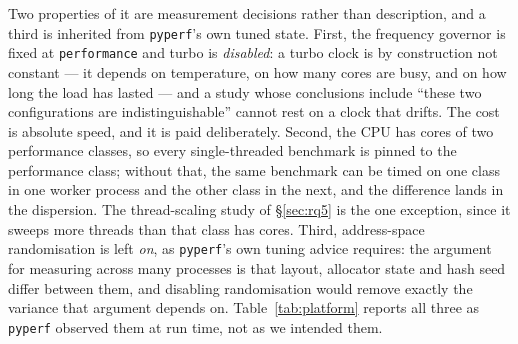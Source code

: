 \documentclass[10pt,a4paper]{article}
\newcommand{\code}[1]{\texttt{\small #1}}
\begin{document}
Two properties of it are measurement decisions rather than description, and a third is
inherited from \code{pyperf}'s own tuned state. First, the frequency
governor is fixed at \code{performance} and turbo is \emph{disabled}: a turbo clock is by
construction not constant --- it depends on temperature, on how many cores are busy, and on how
long the load has lasted --- and a study whose conclusions include ``these two configurations
are indistinguishable'' cannot rest on a clock that drifts. The cost is absolute speed, and it
is paid deliberately. Second, the CPU has cores of two performance classes, so every
single-threaded benchmark is pinned to the performance class; without that, the same benchmark
can be timed on one class in one worker process and the other class in the next, and the
difference lands in the dispersion. The thread-scaling study of \S\ref{sec:rq5} is the one
exception, since it sweeps more threads than that class has cores. Third, address-space
randomisation is left \emph{on}, as \code{pyperf}'s own tuning advice requires:
the argument for measuring across many processes is that layout, allocator state and hash seed
differ between them, and disabling randomisation would remove exactly the variance that
argument depends on. Table~\ref{tab:platform} reports all three as \code{pyperf} observed them
at run time, not as we intended them.

\begin{table}[t]
  \centering
  \caption{The measurement host. Every field is read back from an artefact the run produced:
  the machine description written on the host itself, and \code{pyperf}'s per-run metadata.}
  \label{tab:platform}
  \small
  
\end{table}

\begin{table}[t]
  \centering
  \caption{The measured software stack. Every version here is the one the build scripts pin and
  install, and \code{bench/plots/check\_versions.py} fails if what is installed differs, so this
  table states what ran rather than what was once written down.}
  \label{tab:versions}
  \small
  
\end{table}
\end{document}
